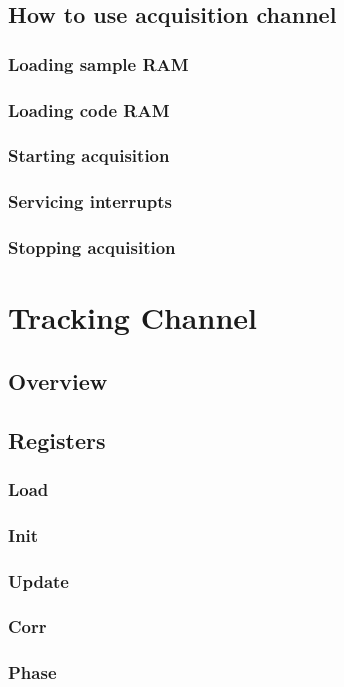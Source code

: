 \documentclass{article}
\begin{document}
\begin{multicols}{2}
\subsection{How to use acquisition channel}
\subsubsection{Loading sample RAM}
\subsubsection{Loading code RAM}
\subsubsection{Starting acquisition}
\subsubsection{Servicing interrupts}
\subsubsection{Stopping acquisition}

\section{Tracking Channel}
\subsection{Overview}
\subsection{Registers}
\subsubsection{Load}
\subsubsection{Init}
\subsubsection{Update}
\subsubsection{Corr}
\subsubsection{Phase}

\end{multicols}
\end{document}
